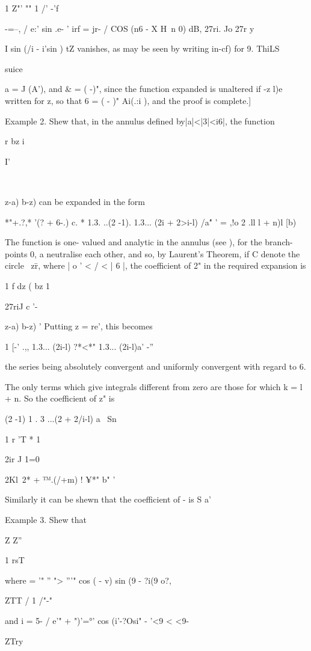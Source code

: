 {{1 Z"' "" 1 /' -'f

 -=--, / e:' sin .e- ' irf = jr- / COS (n6 - X H\ n 0) dB, 27ri. Jo
27r y

I sin (/i - i'sin ) tZ vanishes, as may be seen by writing in-cf) for
9. ThiLS

suice

a = J (A'), and \& = ( -)", since the function expanded is unaltered
if -z  l)e written for z, so that 6 = ( - )" Ai(.:i ), and the proof
is complete.]

Example 2. Shew that, in the annulus defined by|a|<|3|<i6|, the
function

r bz i

I'

\ \ {z-a) b-z) can be expanded in the form

*"+.?,* '(? + 6-.) c. * 1.3. ..(2 -1). 1.3... (2i + 2>i-l) /a\' " ' =
,!o 2 .ll l + n)l [b)

The function is one- valued and analytic in the annulus (see ),
for the branch-points 0, a neutralise each other, and so, by Laurent's
Theorem, if C denote the circle \ z\=r, where | o ' < / < | 6 |, the
coefficient of 2" in the required expansion is

1 f dz ( bz 1

27riJ c '- \ \ {z-a) b-z) ' Putting z = re', this becomes

1 [-' .,, 1.3... (2i-l) ?*<*" 1.3... (2i-l)a' -''

the series being absolutely convergent and uniformly convergent with
regard to 6.

The only terms which give integrals different from zero are those for
which k = l + n. So the coefficient of z" is

(2 -1) 1 . 3 ...(2 + 2/i-l) a \ Sn

1 r 'T * 1

2ir J 1=0

2Kl\ 2* + ™.(/+m) ! ¥*" b" '

Similarly it can be shewn that the coefficient of - is S a'\

%
%

Example 3. Shew that

Z Z''

1 rsT

where = '" '' "> '''" cos ( - v) sin (9 - ?i(9 o?,

ZTT / 1 /"-"

and i = 5- / e'" + ")'=°' cos (i'-?Osi" - '<9 < <9-

ZTry

}}}}
